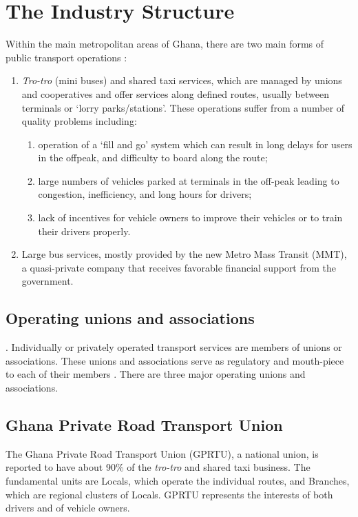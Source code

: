 \section{The Industry Structure}
Within the main metropolitan areas of Ghana, there are two main forms of public transport operations \citep{finn2009new}:
\begin{enumerate}
	\item \textit{Tro-tro} (mini buses) and shared taxi services, which are managed by unions and cooperatives and offer services along defined routes, usually between terminals or ‘lorry parks/stations’. These operations suffer from a number of quality problems including:
	
	\begin{enumerate}
		\item operation of a ‘fill and go’ system which can result in long delays for users in the offpeak, and difficulty to board along the route;
		\item large numbers of vehicles parked at
		terminals in the off-peak leading to congestion, inefficiency, and long hours for
		drivers; 
		\item lack of incentives for vehicle owners to improve their vehicles or to train their drivers properly.
	\end{enumerate}
	
	\item Large bus services, mostly provided by the new Metro Mass Transit (MMT), a quasi-private company that receives favorable financial support from the government.
\end{enumerate}

\subsection{Operating unions and associations}. 
Individually or privately operated transport services are members of unions or associations. These unions and associations serve as regulatory and mouth-piece to each of their members \citep{fouracre1994public}. There are three major operating unions and associations.

\subsection{Ghana Private Road Transport Union}
The Ghana Private Road Transport Union (GPRTU), a national union, is reported to have about 90\% of the \textit{tro-tro} and shared taxi business. The fundamental units are Locals, which operate the individual routes, and Branches, which are regional clusters of Locals. GPRTU represents the interests of both drivers and of vehicle owners.

